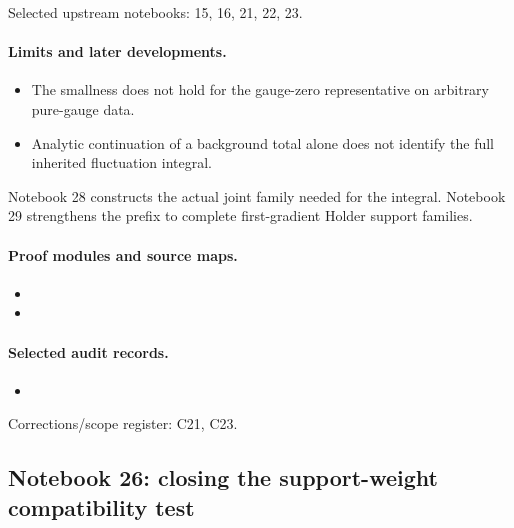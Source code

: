 \documentclass[11pt]{article}
\theoremstyle{remark}
\begin{document}
Selected upstream notebooks: 15, 16, 21, 22, 23.\par

\paragraph{Limits and later developments.}
\begin{itemize}
\item The smallness does not hold for the gauge-zero representative on arbitrary pure-gauge data.
\item Analytic continuation of a background total alone does not identify the full inherited fluctuation integral.
\end{itemize}

Notebook 28 constructs the actual joint family needed for the integral. Notebook 29 strengthens the prefix to complete first-gradient Holder support families.

\paragraph{Proof modules and source maps.}
\begingroup\small
\begin{itemize}
\item {}
\item {}
\end{itemize}
\endgroup

\paragraph{Selected audit records.}
\begingroup\small
\begin{itemize}
\item {}
\end{itemize}
\endgroup
Corrections/scope register: C21, C23.\par

\subsection{Notebook 26: closing the support-weight compatibility test}
\label{hnc-26}
\noindent{}\par
\end{document}
